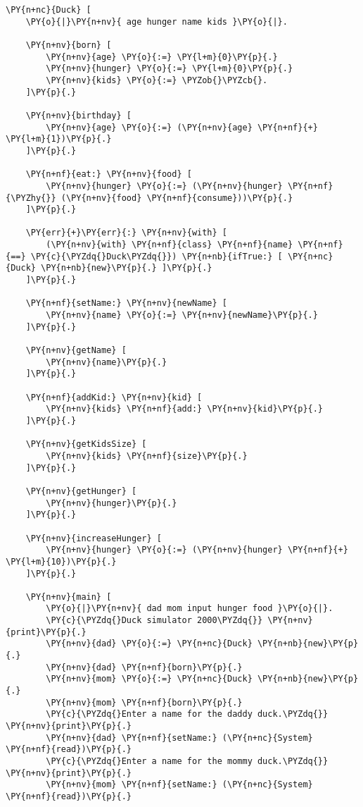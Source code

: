 \begin{Verbatim}[commandchars=\\\{\}]
\PY{n+nc}{Duck} [
    \PY{o}{|}\PY{n+nv}{ age hunger name kids }\PY{o}{|}.
    
    \PY{n+nv}{born} [
        \PY{n+nv}{age} \PY{o}{:=} \PY{l+m}{0}\PY{p}{.}
        \PY{n+nv}{hunger} \PY{o}{:=} \PY{l+m}{0}\PY{p}{.}
        \PY{n+nv}{kids} \PY{o}{:=} \PYZob{}\PYZcb{}.
    ]\PY{p}{.}
    
    \PY{n+nv}{birthday} [
        \PY{n+nv}{age} \PY{o}{:=} (\PY{n+nv}{age} \PY{n+nf}{+} \PY{l+m}{1})\PY{p}{.}
    ]\PY{p}{.}
    
    \PY{n+nf}{eat:} \PY{n+nv}{food} [
        \PY{n+nv}{hunger} \PY{o}{:=} (\PY{n+nv}{hunger} \PY{n+nf}{\PYZhy{}} (\PY{n+nv}{food} \PY{n+nf}{consume}))\PY{p}{.}
    ]\PY{p}{.}
    
    \PY{err}{+}\PY{err}{:} \PY{n+nv}{with} [
        (\PY{n+nv}{with} \PY{n+nf}{class} \PY{n+nf}{name} \PY{n+nf}{==} \PY{c}{\PYZdq{}Duck\PYZdq{}}) \PY{n+nb}{ifTrue:} [ \PY{n+nc}{Duck} \PY{n+nb}{new}\PY{p}{.} ]\PY{p}{.}
    ]\PY{p}{.}
    
    \PY{n+nf}{setName:} \PY{n+nv}{newName} [
        \PY{n+nv}{name} \PY{o}{:=} \PY{n+nv}{newName}\PY{p}{.}
    ]\PY{p}{.}
    
    \PY{n+nv}{getName} [
        \PY{n+nv}{name}\PY{p}{.}
    ]\PY{p}{.}
    
    \PY{n+nf}{addKid:} \PY{n+nv}{kid} [
        \PY{n+nv}{kids} \PY{n+nf}{add:} \PY{n+nv}{kid}\PY{p}{.}
    ]\PY{p}{.}
    
    \PY{n+nv}{getKidsSize} [
        \PY{n+nv}{kids} \PY{n+nf}{size}\PY{p}{.}
    ]\PY{p}{.}
    
    \PY{n+nv}{getHunger} [
        \PY{n+nv}{hunger}\PY{p}{.}
    ]\PY{p}{.}
    
    \PY{n+nv}{increaseHunger} [
        \PY{n+nv}{hunger} \PY{o}{:=} (\PY{n+nv}{hunger} \PY{n+nf}{+} \PY{l+m}{10})\PY{p}{.}
    ]\PY{p}{.}
    
    \PY{n+nv}{main} [
        \PY{o}{|}\PY{n+nv}{ dad mom input hunger food }\PY{o}{|}.
        \PY{c}{\PYZdq{}Duck simulator 2000\PYZdq{}} \PY{n+nv}{print}\PY{p}{.}
        \PY{n+nv}{dad} \PY{o}{:=} \PY{n+nc}{Duck} \PY{n+nb}{new}\PY{p}{.}
        \PY{n+nv}{dad} \PY{n+nf}{born}\PY{p}{.}
        \PY{n+nv}{mom} \PY{o}{:=} \PY{n+nc}{Duck} \PY{n+nb}{new}\PY{p}{.}
        \PY{n+nv}{mom} \PY{n+nf}{born}\PY{p}{.}
        \PY{c}{\PYZdq{}Enter a name for the daddy duck.\PYZdq{}} \PY{n+nv}{print}\PY{p}{.}
        \PY{n+nv}{dad} \PY{n+nf}{setName:} (\PY{n+nc}{System} \PY{n+nf}{read})\PY{p}{.}
        \PY{c}{\PYZdq{}Enter a name for the mommy duck.\PYZdq{}} \PY{n+nv}{print}\PY{p}{.}
        \PY{n+nv}{mom} \PY{n+nf}{setName:} (\PY{n+nc}{System} \PY{n+nf}{read})\PY{p}{.}
        

\end{Verbatim}
